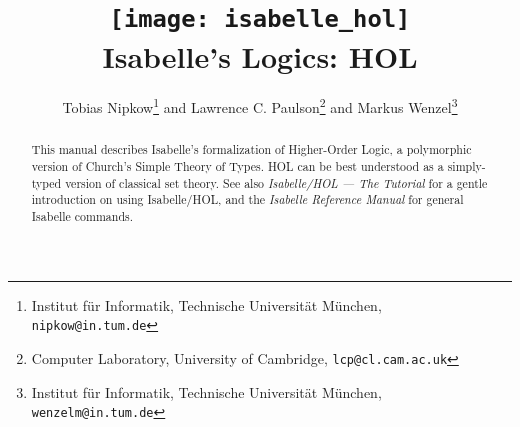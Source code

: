 \documentclass[12pt,a4paper]{report}
\title{\texttt{[image: isabelle\_hol]} \\[4ex] 
       Isabelle's Logics: HOL}
\author{Tobias Nipkow\footnote
{Institut f\"ur Informatik, Technische Universit\"at M\"unchen,
 \texttt{nipkow@in.tum.de}} and
Lawrence C. Paulson\footnote
{Computer Laboratory, University of Cambridge, \texttt{lcp@cl.cam.ac.uk}} and
Markus Wenzel\footnote
{Institut f\"ur Informatik, Technische Universit\"at M\"unchen,
 \texttt{wenzelm@in.tum.de}}}
\begin{document}
\maketitle 

\begin{abstract}
  This manual describes Isabelle's formalization of Higher-Order Logic, a
  polymorphic version of Church's Simple Theory of Types.  HOL can be best
  understood as a simply-typed version of classical set theory.  See also
  \emph{Isabelle/HOL --- The Tutorial} for a gentle introduction on using
  Isabelle/HOL, and the \emph{Isabelle Reference Manual} for general Isabelle
  commands.
\end{abstract}

 \tableofcontents \clearfirst




\printindex
\end{document}
